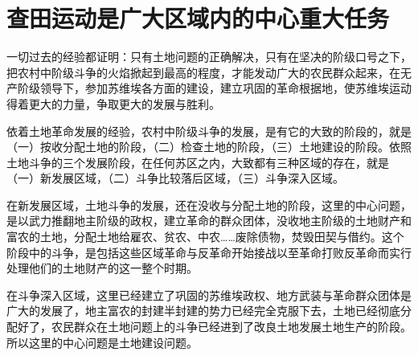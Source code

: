 \section[查田运动是广大区域内的中心重大任务（一九三三年）]{查田运动是广大区域内的中心重大任务}


一切过去的经验都证明：只有土地问题的正确解决，只有在坚决的阶级口号之下，把农村中阶级斗争的火焰掀起到最高的程度，才能发动广大的农民群众起来，在无产阶级领导下，参加苏维埃各方面的建设，建立巩固的革命根据地，使苏维埃运动得着更大的力量，争取更大的发展与胜利。

依着土地革命发展的经验，农村中阶级斗争的发展，是有它的大致的阶段的，就是（一）按收分配土地的阶段，（二）检查土地的阶段，（三）土地建设的阶段。依照土地斗争的三个发展阶段，在任何苏区之内，大致都有三种区域的存在，就是（一）新发展区域，（二）斗争比较落后区域，（三）斗争深入区域。

在新发展区域，土地斗争的发展，还在没收与分配土地的阶段，这里的中心问题，是以武力推翻地主阶级的政权，建立革命的群众团体，没收地主阶级的土地财产和富农的土地，分配土地给雇农、贫农、中农……废除债物，焚毁田契与借约。这个阶段中的斗争，是包括这些区域革命与反革命开始接战以至革命打败反革命而实行处理他们的土地财产的这一整个时期。

在斗争深入区域，这里已经建立了巩固的苏维埃政权、地方武装与革命群众团体是广大的发展了，地主富农的封建半封建的势力已经完全克服下去，土地已经彻底分配好了，农民群众在土地问题上的斗争已经进到了改良土地发展土地生产的阶段。所以这里的中心问题是土地建设问题。

